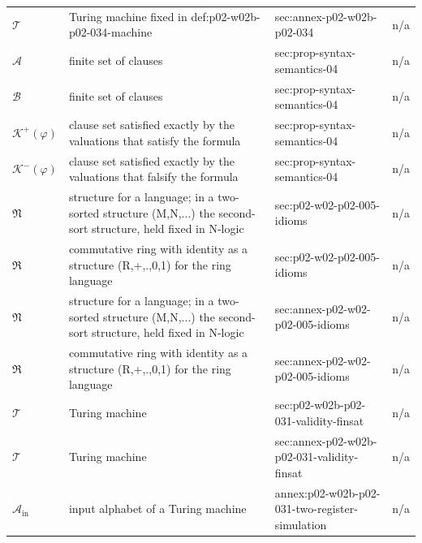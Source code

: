 \begin{longtable}{@{}p{}p{}p{}p{}@{}}
\(\mathcal T\) & Turing machine fixed in def:p02-w02b-p02-034-machine & sec:\allowbreak{}annex-\allowbreak{}p02-\allowbreak{}w02b-\allowbreak{}p02-\allowbreak{}034 & n/a \\
\(\mathcal A\) & finite set of clauses & sec:\allowbreak{}prop-\allowbreak{}syntax-\allowbreak{}semantics-\allowbreak{}04 & n/a \\
\(\mathcal B\) & finite set of clauses & sec:\allowbreak{}prop-\allowbreak{}syntax-\allowbreak{}semantics-\allowbreak{}04 & n/a \\
\(\mathcal K^{+}(\varphi)\) & clause set satisfied exactly by the valuations that satisfy the formula & sec:\allowbreak{}prop-\allowbreak{}syntax-\allowbreak{}semantics-\allowbreak{}04 & n/a \\
\(\mathcal K^{-}(\varphi)\) & clause set satisfied exactly by the valuations that falsify the formula & sec:\allowbreak{}prop-\allowbreak{}syntax-\allowbreak{}semantics-\allowbreak{}04 & n/a \\
\(\mathfrak N\) & structure for a language; in a two-sorted structure (M,N,...) the second-sort structure, held fixed in N-logic & sec:\allowbreak{}p02-\allowbreak{}w02-\allowbreak{}p02-\allowbreak{}005-\allowbreak{}idioms & n/a \\
\(\mathfrak R\) & commutative ring with identity as a structure (R,+,.,0,1) for the ring language & sec:\allowbreak{}p02-\allowbreak{}w02-\allowbreak{}p02-\allowbreak{}005-\allowbreak{}idioms & n/a \\
\(\mathfrak N\) & structure for a language; in a two-sorted structure (M,N,...) the second-sort structure, held fixed in N-logic & sec:\allowbreak{}annex-\allowbreak{}p02-\allowbreak{}w02-\allowbreak{}p02-\allowbreak{}005-\allowbreak{}idioms & n/a \\
\(\mathfrak R\) & commutative ring with identity as a structure (R,+,.,0,1) for the ring language & sec:\allowbreak{}annex-\allowbreak{}p02-\allowbreak{}w02-\allowbreak{}p02-\allowbreak{}005-\allowbreak{}idioms & n/a \\
\(\mathcal T\) & Turing machine & sec:\allowbreak{}p02-\allowbreak{}w02b-\allowbreak{}p02-\allowbreak{}031-\allowbreak{}validity-\allowbreak{}finsat & n/a \\
\(\mathcal T\) & Turing machine & sec:\allowbreak{}annex-\allowbreak{}p02-\allowbreak{}w02b-\allowbreak{}p02-\allowbreak{}031-\allowbreak{}validity-\allowbreak{}finsat & n/a \\
\(\mathcal A_{\mathrm{in}}\) & input alphabet of a Turing machine & annex:\allowbreak{}p02-\allowbreak{}w02b-\allowbreak{}p02-\allowbreak{}031-\allowbreak{}two-\allowbreak{}register-\allowbreak{}simulation & n/a \\

\end{longtable}
